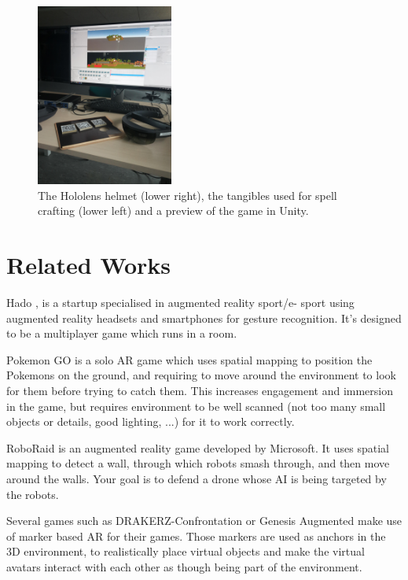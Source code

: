 \documentclass[sigchi, authorversion, screen]{acmart}
\begin{document}
\begin{figure}[ht]
  \includegraphics[width=0.4\textwidth]{project_preview.jpg}
  \caption{The Hololens helmet (lower right), the tangibles used for spell crafting (lower left) and a preview of the game in Unity.}
  \label{fig:setup_teaser}
\end{figure} 

\section{Related Works}

Hado \cite{hado}, is a startup specialised in augmented reality sport/e- sport using augmented reality headsets and smartphones for gesture recognition. It’s designed to be a multiplayer game which runs in a room.

Pokemon GO \cite{pokemongo} is a solo AR game which uses spatial mapping to position the Pokemons on the ground, and requiring to move around the environment to look for them before trying to catch them. This increases engagement and immersion in the game, but requires environment to be well scanned (not too many small objects or details, good lighting, ...) for it to work correctly.

RoboRaid \cite{roboraid}is an augmented reality game developed by Microsoft. It uses spatial mapping to detect a wall, through which robots smash through, and then move around the walls. Your goal is to defend a drone whose AI is being targeted by the robots. 

Several games such as DRAKERZ-Confrontation \cite{drakerz} or Genesis Augmented \cite{genesisaugmented} make use of marker based AR for their games. Those markers are used as anchors in the 3D environment, to realistically place virtual objects and make the virtual avatars interact with each other as though being part of the environment.
\end{document}

